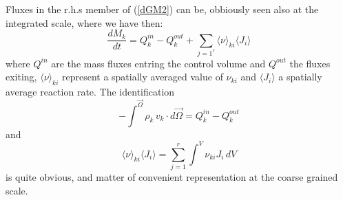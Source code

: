 Fluxes in the r.h.s member of (\ref{dGM2}) can be, obbiously seen also at the integrated scale, where we have then:
\begin{equation}
\frac{dM_k}{dt} = Q_k^{in} - Q_k^{out} + \sum_{j=1^r} \langle\nu \rangle_{ki} \langle J_i \rangle
\end{equation}
where $Q^{in}$ are the mass fluxes entring the control volume and $Q^{out}$ the fluxes exiting, $\langle\nu \rangle_{ki}$ represent a spatially averaged value of $\nu_{ki}$ and $\langle J_i \rangle$ a spatially average reaction rate.
The identification 
\begin{equation}
- \int^\vec{\Omega} \rho_k\, v_k \cdot d\vec{\Omega} = Q_k^{in} - Q_k^{out}
\end{equation}
and 
\begin{equation}
\langle\nu \rangle_{ki} \langle J_i \rangle = \sum_{j=1}^r \int^V \nu_{ki} J_i\, dV
\end{equation}
is quite obvious, and matter of convenient representation at the coarse grained scale. 